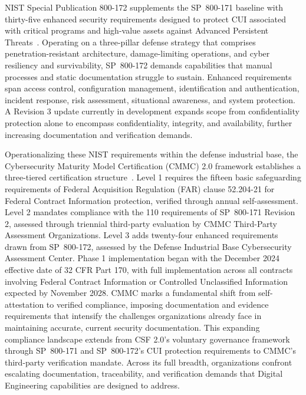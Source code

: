 NIST Special Publication 800-172 supplements the SP~800-171 baseline with thirty-five enhanced security requirements designed to protect CUI associated with critical programs and high-value assets against Advanced Persistent Threats~\parencite{NIST_SP_800_172_2021}. Operating on a three-pillar defense strategy that comprises penetration-resistant architecture, damage-limiting operations, and cyber resiliency and survivability, SP~800-172 demands capabilities that manual processes and static documentation struggle to sustain. Enhanced requirements span access control, configuration management, identification and authentication, incident response, risk assessment, situational awareness, and system protection. A Revision 3 update currently in development expands scope from confidentiality protection alone to encompass confidentiality, integrity, and availability, further increasing documentation and verification demands.

Operationalizing these NIST requirements within the defense industrial base, the Cybersecurity Maturity Model Certification (CMMC) 2.0 framework establishes a three-tiered certification structure~\parencite{DoD_CMMC_2024}. Level 1 requires the fifteen basic safeguarding requirements of Federal Acquisition Regulation (FAR) clause 52.204-21 for Federal Contract Information protection, verified through annual self-assessment.
Level 2 mandates compliance with the 110 requirements of SP~800-171 Revision 2, assessed through triennial third-party evaluation by CMMC Third-Party Assessment Organizations. Level 3 adds twenty-four enhanced requirements drawn from SP~800-172, assessed by the Defense Industrial Base Cybersecurity Assessment Center. Phase 1 implementation began with the December 2024 effective date of 32 CFR Part 170, with full implementation across all contracts involving Federal Contract Information or Controlled Unclassified Information expected by November 2028. CMMC marks a fundamental shift from self-attestation to verified compliance, imposing documentation and evidence requirements that intensify the challenges organizations already face in maintaining accurate, current security documentation. This expanding compliance landscape extends from CSF 2.0's voluntary governance framework through SP~800-171 and SP~800-172's CUI protection requirements to CMMC's third-party verification mandate. Across its full breadth, organizations confront escalating documentation, traceability, and verification demands that Digital Engineering capabilities are designed to address.

